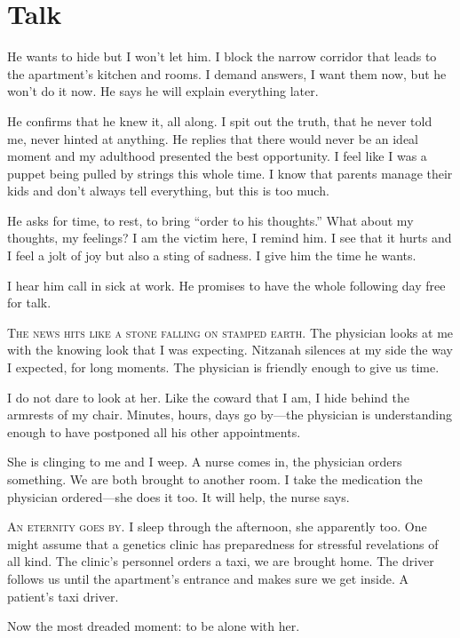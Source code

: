 \chapter*{Talk}\label{talk}

He wants to hide but I won't let him. I block the narrow corridor that leads to the apartment's kitchen and rooms. I demand answers, I want them now, but he won't do it now. He says he will explain everything later.

He confirms that he knew it, all along. I spit out the truth, that he never told me, never hinted at anything. He replies that there would never be an ideal moment and my adulthood presented the best opportunity. I feel like I was a puppet being pulled by strings this whole time. I know that parents manage their kids and don't always tell everything, but this is too much.

He asks for time, to rest, to bring \enquote{order to his thoughts.} What about my thoughts, my feelings? I am the victim here, I remind him. I see that it hurts and I feel a jolt of joy but also a sting of sadness. I give him the time he wants.

I hear him call in sick at work. He promises to have the whole following day free for talk.

\bigskip\noindent\textsc{The news hits like a stone falling on stamped earth.} The physician looks at me with the knowing look that I was expecting. Nitzanah silences at my side the way I expected, for long moments. The physician is friendly enough to give us time. 

I do not dare to look at her. Like the coward that I am, I hide behind the armrests of my chair. Minutes, hours, days go by---the physician is understanding enough to have postponed all his other appointments.

She is clinging to me and I weep. A nurse comes in, the physician orders something. We are both brought to another room. I take the medication the physician ordered---she does it too. It will help, the nurse says. 

\bigskip\noindent\textsc{An eternity goes by.} I sleep through the afternoon, she apparently too. One might assume that a genetics clinic has preparedness for stressful revelations of all kind. The clinic's personnel orders a taxi, we are brought home. The driver follows us until the apartment's entrance and makes sure we get inside. A patient's taxi driver.

Now the most dreaded moment: to be alone with her.